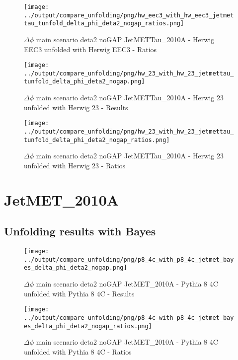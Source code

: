 \documentclass[11pt]{book}
\begin{document}
\begin{figure}[ht]
\centering
\texttt{[image: ../output/compare\_unfolding/png/hw\_eec3\_with\_hw\_eec3\_jetmettau\_tunfold\_delta\_phi\_deta2\_nogap\_ratios.png]}
\caption{$\Delta\phi$ main scenario deta2 noGAP JetMETTau\_2010A - Herwig EEC3 unfolded with Herwig EEC3 - Ratios}
\label{hw_eec3_hw_eec3_jetmettau_tunfold_delta_phi_deta2_nogap_b}
\end{figure}

\begin{figure}[ht]
\centering
\texttt{[image: ../output/compare\_unfolding/png/hw\_23\_with\_hw\_23\_jetmettau\_tunfold\_delta\_phi\_deta2\_nogap.png]}
\caption{$\Delta\phi$ main scenario deta2 noGAP JetMETTau\_2010A - Herwig 23 unfolded with Herwig 23 - Results}
\label{hw_23_hw_23_jetmettau_tunfold_delta_phi_deta2_nogap_a}
\end{figure}

\begin{figure}[ht]
\centering
\texttt{[image: ../output/compare\_unfolding/png/hw\_23\_with\_hw\_23\_jetmettau\_tunfold\_delta\_phi\_deta2\_nogap\_ratios.png]}
\caption{$\Delta\phi$ main scenario deta2 noGAP JetMETTau\_2010A - Herwig 23 unfolded with Herwig 23 - Ratios}
\label{hw_23_hw_23_jetmettau_tunfold_delta_phi_deta2_nogap_b}
\end{figure}


\section{JetMET\_2010A}
\subsection{Unfolding results with Bayes}

\begin{figure}[ht]
\centering
\texttt{[image: ../output/compare\_unfolding/png/p8\_4c\_with\_p8\_4c\_jetmet\_bayes\_delta\_phi\_deta2\_nogap.png]}
\caption{$\Delta\phi$ main scenario deta2 noGAP JetMET\_2010A - Pythia 8 4C unfolded with Pythia 8 4C - Results}
\label{p8_p8_jetmet_bayes_delta_phi_deta2_nogap_a}
\end{figure}

\begin{figure}[ht]
\centering
\texttt{[image: ../output/compare\_unfolding/png/p8\_4c\_with\_p8\_4c\_jetmet\_bayes\_delta\_phi\_deta2\_nogap\_ratios.png]}
\caption{$\Delta\phi$ main scenario deta2 noGAP JetMET\_2010A - Pythia 8 4C unfolded with Pythia 8 4C - Ratios}
\label{p8_p8_jetmet_bayes_delta_phi_deta2_nogap_b}
\end{figure}
\end{document}
